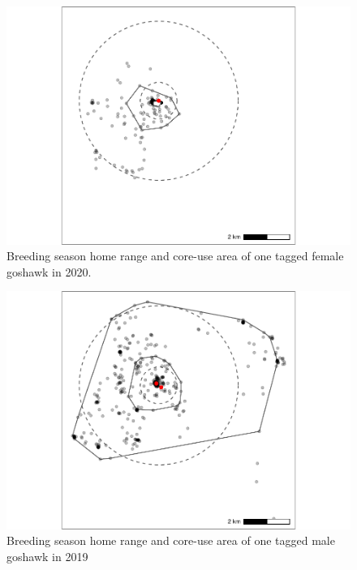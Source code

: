 \documentclass{sfuthesis}
\begin{document}
\begin{figure}
\centering
\includegraphics{index_files/figure-latex/rlk-female-1.pdf}
\caption{\label{fig:rlk-female}Breeding season home range and core-use area of one tagged female goshawk in 2020.}
\end{figure}

\begin{figure}
\centering
\includegraphics{index_files/figure-latex/rlk-male-1.pdf}
\caption{\label{fig:rlk-male}Breeding season home range and core-use area of one tagged male goshawk in 2019}
\end{figure}
\end{document}
